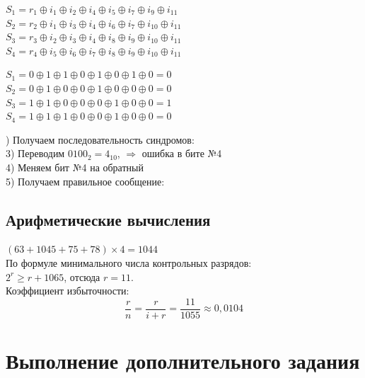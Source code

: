 \documentclass[12pt]{article}
\begin{document}
\begin{multicols}{2}

    \centering

    $S_1 = r_1 \oplus i_1 \oplus i_2 \oplus i_4 \oplus i_5 \oplus i_7 \oplus i_9 \oplus i_{11}$\\
    $S_2 = r_2 \oplus i_1 \oplus i_3 \oplus i_4 \oplus i_6 \oplus i_7 \oplus i_{10} \oplus i_{11}$\\
    $S_3 = r_3 \oplus i_2 \oplus i_3 \oplus i_4 \oplus i_8 \oplus i_9 \oplus i_{10} \oplus i_{11}$\\
    $S_4 = r_4 \oplus i_5 \oplus i_6 \oplus i_7 \oplus i_8 \oplus i_9 \oplus i_{10} \oplus i_{11}$\\

    \columnbreak

    $S_1 = 0 \oplus 1 \oplus 1 \oplus 0 \oplus 1 \oplus 0 \oplus 1 \oplus 0 = 0$\\
    $S_2 = 0 \oplus 1 \oplus 0 \oplus 0 \oplus 1 \oplus 0 \oplus 0 \oplus 0 = 0$\\
    $S_3 = 1 \oplus 1 \oplus 0 \oplus 0 \oplus 0 \oplus 1 \oplus 0 \oplus 0 = 1$\\
    $S_4 = 1 \oplus 1 \oplus 1 \oplus 0 \oplus 0 \oplus 1 \oplus 0 \oplus 0 = 0$\\

\end{multicols}

) Получаем последовательность синдромов: \\
3) Переводим $0100_2 = 4_{10}$, $\Rightarrow$ ошибка в бите №4\\
4) Меняем бит №4 на обратный\\
5) Получаем правильное сообщение: 

\newpage

\subsection{Арифметические вычисления}

$(63 + 10 45 + 75 + 78) \times 4 = 1044$\\
По формуле минимального числа контрольных разрядов:\\
$2^r \ge r + 1065$, отсюда $r = 11$.\\
Коэффициент избыточности:\\
$$\frac{r}{n} = \frac{r}{i + r} = \frac{11}{1055} \approx 0,0104$$

\section{Выполнение дополнительного задания}
\end{document}
